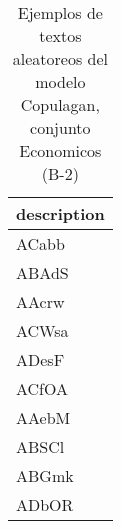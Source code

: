 \begin{table}[H]
\centering
\fontsize{8}{14}\selectfont
\caption{Ejemplos de textos aleatoreos del modelo Copulagan, conjunto Economicos (B-2)}
\label{table-sample10-economicos-b-2-copulagan-text}
\begin{tabular}{|m{50em}|}
\hline
\rowcolor[gray]{0.8}
description \\
\hline ACabb \\
\hline ABAdS \\
\hline AAcrw \\
\hline ACWsa \\
\hline ADesF \\
\hline ACfOA \\
\hline AAebM \\
\hline ABSCl \\
\hline ABGmk \\
\hline ADbOR \\
\hline
\end{tabular}
\end{table}
